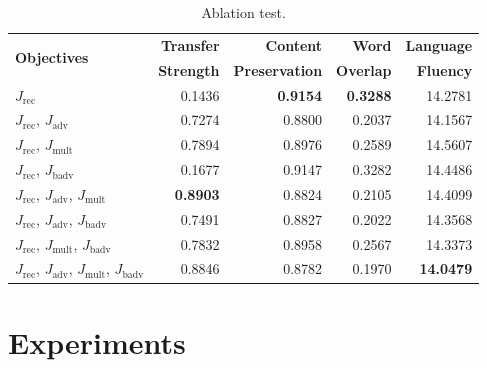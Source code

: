 \documentclass[11pt,a4paper]{article}
\begin{document}
\begin{table}[ht]
	\centering
	\begin{tabular}{| l | r | r | r | r |}
		\hline
		\multirow{2}{*}{
		\textbf{Objectives}}                                             & \textbf{Transfer} & \textbf{Content}      & \textbf{Word}    & \textbf{Language} \\
		                                                                 & \textbf{Strength} & \textbf{Preservation} & \textbf{Overlap} & \textbf{Fluency}  \\
		\hline
		\hline
		$J_\text{rec}$                                                   & 0.1436            & \textbf{0.9154}       & \textbf{0.3288}  & 14.2781           \\
		\hline
		$J_\text{rec}$, $J_\text{adv}$                                   & 0.7274            & 0.8800                & 0.2037           & 14.1567           \\
		\hline
		$J_\text{rec}$, $J_\text{mult}$                                  & 0.7894            & 0.8976                & 0.2589           & 14.5607           \\
		\hline
		$J_\text{rec}$, $J_\text{badv}$                                  & 0.1677            & 0.9147                & 0.3282           & 14.4486           \\
		\hline
		$J_\text{rec}$, $J_\text{adv}$, $J_\text{mult}$                  & \textbf{0.8903}   & 0.8824                & 0.2105           & 14.4099           \\
		\hline
		$J_\text{rec}$, $J_\text{adv}$, $J_\text{badv}$                  & 0.7491            & 0.8827                & 0.2022           & 14.3568           \\
		\hline
		$J_\text{rec}$, $J_\text{mult}$, $J_\text{badv}$                 & 0.7832            & 0.8958                & 0.2567           & 14.3373           \\
		\hline
		$J_\text{rec}$, $J_\text{adv}$, $J_\text{mult}$, $J_\text{badv}$ & 0.8846            & 0.8782                & 0.1970           & \textbf{14.0479}  \\
		\hline
	\end{tabular}
	\caption{Ablation test.}
	\label{tab:ablation-results}
\end{table}

\section{Experiments}
\end{document}
